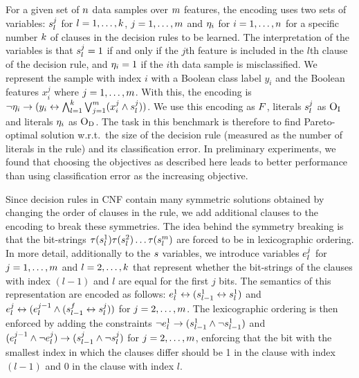For a given set of $n$ data samples over $m$ features, the encoding uses two sets of variables:
$s_l^j$ for $l=1,\dots,k$, $j=1,\dots,m$ and $\eta_i$ for $i=1,\dots,n$ for a specific number $k$ of clauses in the decision rules to be learned.
The interpretation of the variables is that $s_l^j=1$ if and only if the $j$th feature is included in the $l$th clause of the decision rule, and $\eta_i=1$ if the $i$th data sample is misclassified.
We represent the sample with index $i$ with a Boolean class label $y_i$ and the Boolean features $x_i^j$ where $j=1,\dots,m$.
With this, the encoding is $\lnot \eta_i \rightarrow (y_i \leftrightarrow \bigwedge_{l=1}^k \bigvee_{j=1}^m (x_i^j \land s_l^j))$.
We use this encoding as $F$, literals $s_l^j$ as $\textsc{O}_{\text{I}}$ and literals $\eta_i$ as $\textsc{O}_{\text{D}}$.
The task in this benchmark is therefore to find Pareto-optimal solution w.r.t.\ the size of the decision rule (measured as the number of literals in the rule) and its classification error.
In preliminary experiments, we found that choosing the objectives as described here leads to better performance than using classification error as the increasing objective.

Since decision rules in CNF contain many symmetric solutions obtained by changing the order of clauses in the rule, we add additional clauses to the encoding to break these symmetries.
The idea behind the symmetry breaking is that the bit-strings $\tau(s_l^1)\tau(s_l^2)\dots\tau(s_l^m)$ are forced to be in lexicographic ordering.
In more detail, additionally to the $s$ variables, we introduce variables $e_l^j$ for $j=1,\dots,m$ and $l=2,\dots,k$ that represent whether the bit-strings of the clauses with index $(l-1)$ and $l$ are equal for the first $j$ bits.
The semantics of this representation are encoded as follows:
$e_l^1 \leftrightarrow (s_{l-1}^1 \leftrightarrow s_l^1)$ and $e_l^j \leftrightarrow (e_l^{j-1} \land (s_{l-1}^f \leftrightarrow s_l^j))$ for $j=2,\dots,m$.
The lexicographic ordering is then enforced by adding the constraints $\lnot e_l^1 \rightarrow (s_{l-1}^1 \land \lnot s_{l-1}^1)$ and $(e_l^{j-1} \land \lnot e_l^j) \rightarrow (s_{l-1}^j \land \lnot s_l^j)$ for $j=2,\dots,m$, enforcing that the bit with the smallest index in which the clauses differ should be 1 in the clause with index $(l-1)$ and 0 in the clause with index $l$.

